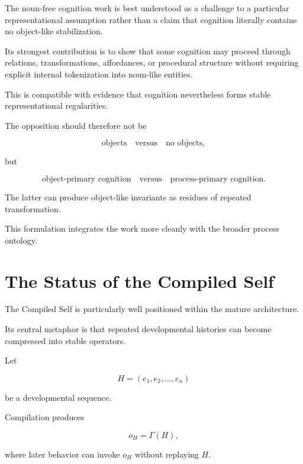 \documentclass[11pt]{article}
\theoremstyle{remark}
\begin{document}
The noun-free cognition work is best understood as a challenge to a particular
representational assumption rather than a claim that cognition literally
contains no object-like stabilization.

Its strongest contribution is to show that some cognition may proceed through
relations, transformations, affordances, or procedural structure without
requiring explicit internal tokenization into noun-like entities.

This is compatible with evidence that cognition nevertheless forms stable
representational regularities.

The opposition should therefore not be

\begin{equation}
\text{objects}
\quad\text{versus}\quad
\text{no objects},
\end{equation}

but

\begin{equation}
\text{object-primary cognition}
\quad\text{versus}\quad
\text{process-primary cognition}.
\end{equation}

The latter can produce object-like invariants as residues of repeated
transformation.

This formulation integrates the work more cleanly with the broader process
ontology.

\section{The Status of the Compiled Self}

The Compiled Self is particularly well positioned within the mature
architecture.

Its central metaphor is that repeated developmental histories can become
compressed into stable operators.

Let

\begin{equation}
H
=
(e_1,e_2,\ldots,e_n)
\end{equation}

be a developmental sequence.

Compilation produces

\begin{equation}
o_H=\Gamma(H),
\end{equation}

where later behavior can invoke $o_H$ without replaying $H$.
\end{document}
